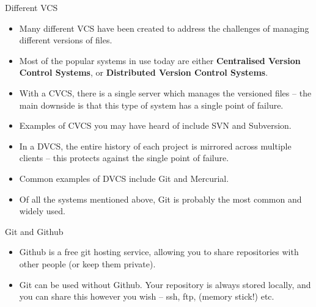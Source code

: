 \documentclass{beamer}
\begin{document}
\begin{frame}{Different VCS}
	\begin{itemize}
		\item<1-> Many different VCS have been created to address the challenges of managing different versions of files.
		\item<2-> Most of the popular systems in use today are either \textbf{Centralised Version Control Systems}, or \textbf{Distributed Version Control Systems}.
		\item<3-> With a CVCS, there is a single server which manages the versioned files -- the main downside is that this type of system has a single point of failure.
		\item<4-> Examples of CVCS you may have heard of include SVN and Subversion.
		\item<5-> In a DVCS, the entire history of each project is mirrored across multiple clients -- this protects against the single point of failure.
		\item<6-> Common examples of DVCS include Git and Mercurial.
		\item<7-> Of all the systems mentioned above, Git is probably the most common and widely used.
	\end{itemize}
\end{frame}

\begin{frame}{Git and Github}
	\onslide<1->{\center\texttt{[image: Octocat]}}
	\begin{itemize}
		\item<1-> Github is a free git hosting service, allowing you to share repositories with other people (or keep them private).
		\item<2-> Git can be used without Github. Your repository is always stored locally, and you can share this however you wish -- ssh, ftp, (memory stick!) etc.
	\end{itemize}
\end{frame}

\end{document}
